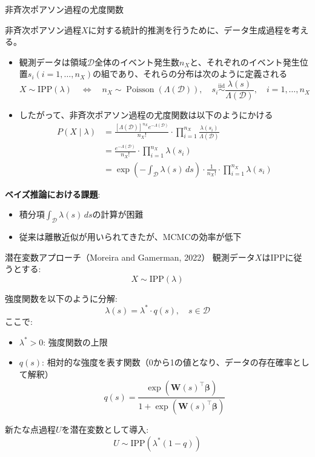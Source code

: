 \documentclass[xelatex, 8pt]{beamer}
\theoremstyle{plain}
\theoremstyle{definition}
\begin{document}
\begin{frame}{非斉次ポアソン過程の尤度関数}

    非斉次ポアソン過程$X$に対する統計的推測を行うために、データ生成過程を考える。
    \begin{itemize}
        \item 観測データは領域$\mathcal{D}$全体のイベント発生数$n_X$と、それぞれのイベント発生位置$s_i (i = 1, \ldots , n_X)$の組であり、それらの分布は次のように定義される
        $$
        X \sim \text{IPP}(\lambda) \quad \Leftrightarrow \quad n_X \sim \operatorname{Poisson}\left(\Lambda(\mathcal{D})\right), \quad s_i \stackrel{\mathrm{iid}}{\sim} \frac{\lambda\left(s\right)}{\Lambda(\mathcal{D})}, \quad i=1, \ldots, n_X
        $$
        \item したがって、非斉次ポアソン過程の尤度関数は以下のようにかける
            $$
            \begin{aligned}
            P(X \mid \lambda)
            &= \frac{\left[\Lambda(\mathcal{D})\right]^{n_X} e^{-\Lambda(\mathcal{D})}}{n_X!} \cdot \prod_{i=1}^{n_X} \frac{\lambda(s_i)}{\Lambda(\mathcal{D})}\\
            &= \frac{e^{-\Lambda(\mathcal{D})}}{n_X!} \cdot \prod_{i=1}^{n_X} \lambda(s_i)\\
            &=  \exp\left( -\int_{\mathcal{D}} \lambda(s) \, ds \right) \cdot \frac{1}{n_X!}\cdot \prod_{i=1}^{n_X} \lambda(s_i)
            \end{aligned}
            $$
    \end{itemize}

    \textbf{ベイズ推論における課題}:
    \begin{itemize}
        \item 積分項$\int_{\mathcal{D}} \lambda(s) \, ds$の計算が困難
        \item 従来は離散近似が用いられてきたが、MCMCの効率が低下
    \end{itemize}
\end{frame}

\begin{frame}{潜在変数アプローチ（Moreira and Gamerman, 2022\cite{Moreira2022}）}
    観測データ$X$はIPPに従うとする:
    $$
        X \sim \text{IPP}(\lambda)
    $$

    強度関数を以下のように分解:
    $$
    \lambda(s) = \lambda^* \cdot q(s), \quad s \in \mathcal{D}
    $$
    ここで:
    \begin{itemize}
        \item $\lambda^* > 0$: 強度関数の上限
        \item $q(s)$: 相対的な強度を表す関数（0から1の値となり、データの存在確率として解釈）
        $$
        q(s) = \frac{\exp(\boldsymbol{W}(s)^\top \boldsymbol{\beta})}{1 + \exp(\boldsymbol{W}(s)^\top \boldsymbol{\beta})}
        $$
    \end{itemize}

    新たな点過程$U$を潜在変数として導入:
    $$
    U \sim \text{IPP}(\lambda^*(1-q))
    $$
\end{frame}
\end{document}

